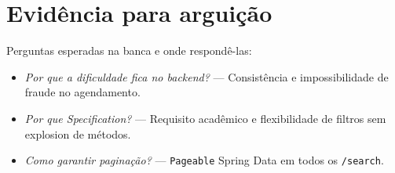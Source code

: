 \section{Evidência para arguição}

Perguntas esperadas na banca e onde respondê-las:
\begin{itemize}
    \item \textit{Por que a dificuldade fica no backend?} --- Consistência e impossibilidade de fraude no agendamento.
    \item \textit{Por que Specification?} --- Requisito acadêmico e flexibilidade de filtros sem explosion de métodos.
    \item \textit{Como garantir paginação?} --- \texttt{Pageable} Spring Data em todos os \texttt{/search}.
\end{itemize}

